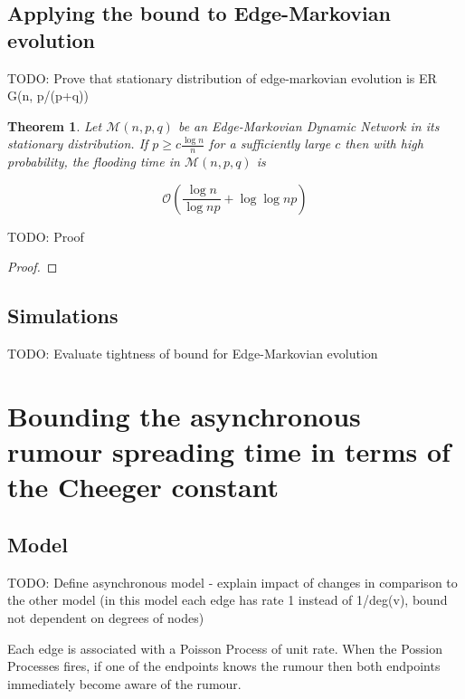 \documentclass[a4paper,11pt]{article}
\newtheorem{theorem}{Theorem}[section]
\theoremstyle{definition}
\begin{document}
\subsection{Applying the bound to Edge-Markovian evolution}

TODO: Prove that stationary distribution of edge-markovian evolution is ER G(n, p/(p+q))

\begin{theorem}
	Let $\mathcal{M}(n, p, q)$ be an Edge-Markovian Dynamic Network in its stationary distribution. If $p \geq c \frac{\log n}{n}$ for a sufficiently large $c$ then with high probability, the flooding time in $\mathcal{M}(n, p, q)$ is 

	$$
		\mathcal{O}\left(\frac{\log n}{\log np} + \log \log np \right)
	$$
\end{theorem}

TODO: Proof

\begin{proof}
	
\end{proof}


\subsection{Simulations}

TODO: Evaluate tightness of bound for Edge-Markovian evolution

\section{Bounding the asynchronous rumour spreading time in terms of the Cheeger constant}

\subsection{Model}

TODO: Define asynchronous model - explain impact of changes in comparison to the other model (in this model each edge has rate 1 instead of 1/deg(v), bound not dependent on degrees of nodes)


Each edge is associated with a Poisson Process of unit rate. When the Possion Processes fires, if one of the endpoints knows the rumour then both endpoints immediately become aware of the rumour. 
\end{document}
